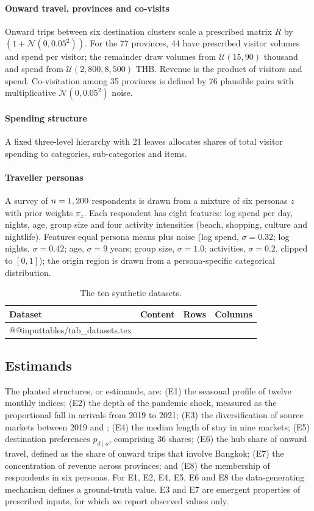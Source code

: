 \documentclass[11pt,a4paper]{article}
\makeatletter
\newcommand{\inputrows}[1]{\csname @@input\endcsname #1 }  %
\makeatother
\begin{document}
\paragraph{Onward travel, provinces and co-visits}
Onward trips between six destination clusters scale a prescribed matrix $R$ by
$(1+\mathcal{N}(0, 0.05^2))$. For the 77 provinces, 44 have prescribed visitor volumes and spend per
visitor; the remainder draw volumes from $\mathcal{U}(15, 90)$ thousand and spend from
$\mathcal{U}(2{,}800, 8{,}500)$ THB. Revenue is the product of visitors and spend. Co-visitation among 35
provinces is defined by 76 plausible pairs with multiplicative $\mathcal{N}(0, 0.05^2)$ noise.

\paragraph{Spending structure}
A fixed three-level hierarchy with 21 leaves allocates shares of total visitor spending to categories,
sub-categories and items.

\paragraph{Traveller personas}
A survey of $n = 1,200$ respondents is drawn from a mixture of six personas $z$ with prior weights
$\pi_z$. Each respondent has eight features: log spend per day, nights, age, group size and four activity
intensities (beach, shopping, culture and nightlife). Features equal persona means plus noise (log spend,
$\sigma = 0.32$; log nights, $\sigma = 0.42$; age, $\sigma = 9$ years; group size, $\sigma = 1.0$;
activities, $\sigma = 0.2$, clipped to $[0,1]$); the origin region is drawn from a persona-specific
categorical distribution.

\begin{table}[!htbp]
\centering
\caption{The ten synthetic datasets.}
\label{tab:datasets}
\small
\begin{tabularx}{\linewidth}{@{}l>{\raggedright\arraybackslash}Xrr@{}}
\toprule
Dataset & Content & Rows & Columns \\
\midrule
\inputrows{tables/tab_datasets.tex}
\bottomrule
\end{tabularx}
\end{table}

\subsection{Estimands}
The planted structures, or estimands, are: (E1) the seasonal profile of twelve monthly indices; (E2) the depth
of the pandemic shock, measured as the proportional fall in arrivals from 2019 to 2021; (E3) the
diversification of source markets between 2019 and \LatestYear; (E4) the median length of stay in nine
markets; (E5) destination preferences $p_{d\mid o}$, comprising 36 shares; (E6) the hub share of onward
travel, defined as the share of onward trips that involve Bangkok; (E7) the concentration of revenue across
provinces; and (E8) the membership of \SegN{} respondents in six personas. For E1, E2, E4, E5, E6 and E8 the
data-generating mechanism defines a ground-truth value. E3 and E7 are emergent properties of prescribed
inputs, for which we report observed values only.
\end{document}
